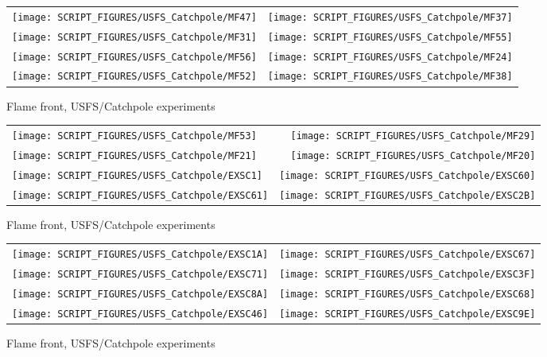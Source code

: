 \begin{figure}[p]
\begin{tabular*}{\textwidth}{l@{\extracolsep{\fill}}r}
\texttt{[image: SCRIPT\_FIGURES/USFS\_Catchpole/MF47]} &
\texttt{[image: SCRIPT\_FIGURES/USFS\_Catchpole/MF37]} \\
\texttt{[image: SCRIPT\_FIGURES/USFS\_Catchpole/MF31]} &
\texttt{[image: SCRIPT\_FIGURES/USFS\_Catchpole/MF55]} \\
\texttt{[image: SCRIPT\_FIGURES/USFS\_Catchpole/MF56]} &
\texttt{[image: SCRIPT\_FIGURES/USFS\_Catchpole/MF24]} \\
\texttt{[image: SCRIPT\_FIGURES/USFS\_Catchpole/MF52]} &
\texttt{[image: SCRIPT\_FIGURES/USFS\_Catchpole/MF38]} \\
\end{tabular*}
\caption[Flame front, USFS/Catchpole experiments]{Flame front, USFS/Catchpole experiments}
\label{USFS_Catchpole_016}
\end{figure}

\begin{figure}[p]
\begin{tabular*}{\textwidth}{l@{\extracolsep{\fill}}r}
\texttt{[image: SCRIPT\_FIGURES/USFS\_Catchpole/MF53]} &
\texttt{[image: SCRIPT\_FIGURES/USFS\_Catchpole/MF29]} \\
\texttt{[image: SCRIPT\_FIGURES/USFS\_Catchpole/MF21]} &
\texttt{[image: SCRIPT\_FIGURES/USFS\_Catchpole/MF20]} \\
\texttt{[image: SCRIPT\_FIGURES/USFS\_Catchpole/EXSC1]} &
\texttt{[image: SCRIPT\_FIGURES/USFS\_Catchpole/EXSC60]} \\
\texttt{[image: SCRIPT\_FIGURES/USFS\_Catchpole/EXSC61]} &
\texttt{[image: SCRIPT\_FIGURES/USFS\_Catchpole/EXSC2B]} \\
\end{tabular*}
\caption[Flame front, USFS/Catchpole experiments]{Flame front, USFS/Catchpole experiments}
\label{USFS_Catchpole_024}
\end{figure}

\begin{figure}[p]
\begin{tabular*}{\textwidth}{l@{\extracolsep{\fill}}r}
\texttt{[image: SCRIPT\_FIGURES/USFS\_Catchpole/EXSC1A]} &
\texttt{[image: SCRIPT\_FIGURES/USFS\_Catchpole/EXSC67]} \\
\texttt{[image: SCRIPT\_FIGURES/USFS\_Catchpole/EXSC71]} &
\texttt{[image: SCRIPT\_FIGURES/USFS\_Catchpole/EXSC3F]} \\
\texttt{[image: SCRIPT\_FIGURES/USFS\_Catchpole/EXSC8A]} &
\texttt{[image: SCRIPT\_FIGURES/USFS\_Catchpole/EXSC68]} \\
\texttt{[image: SCRIPT\_FIGURES/USFS\_Catchpole/EXSC46]} &
\texttt{[image: SCRIPT\_FIGURES/USFS\_Catchpole/EXSC9E]} \\
\end{tabular*}
\caption[Flame front, USFS/Catchpole experiments]{Flame front, USFS/Catchpole experiments}
\label{USFS_Catchpole_032}
\end{figure}

